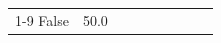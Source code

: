 \begin{table}[H]
\begin{tabular}{lllrlllll}
\cline{1-9}
False & 50.0%
\cline{1-9}
\bottomrule
\end{tabular}
\end{table}

